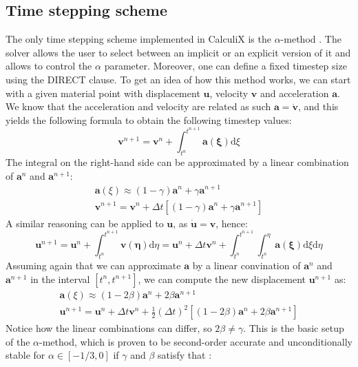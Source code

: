 \documentclass[
  english,        %
  font=times,     %
  onecolumn,      %
]{tumarticle}
\begin{document}
\subsection{Time stepping scheme}\label{sec:alpha}
The only time stepping scheme implemented in CalculiX is the $\alpha$-method \cite{dhondt2017calculix}. The solver allows the user to select between an implicit or an explicit version of it and allows to control the $\alpha$ parameter. Moreover, one can define a fixed timestep size using the DIRECT clause. To get an idea of how this method works, we can start with a given material point with displacement $\boldsymbol{u}$, velocity $\boldsymbol{v}$ and acceleration $\boldsymbol{a}$. We know that the acceleration and velocity are related as such $\boldsymbol{a} = \dot{\boldsymbol{v}}$, and this yields the following formula to obtain the following timestep values:
\begin{equation}
    \boldsymbol{v}^{n+1} = \boldsymbol{v}^n + \int_{t^n}^{t^{n+1}} \boldsymbol{a(\xi)} \text{d}\xi
\end{equation}
The integral on the right-hand side can be approximated by a linear combination of $ \boldsymbol{a}^n$ and $\boldsymbol{a}^{n+1}$:
\begin{gather}
    \boldsymbol{a}(\xi) \approx  (1 - \gamma) \boldsymbol{a}^n + \gamma \boldsymbol{a}^{n+1}\\
    \boldsymbol{v}^{n+1} = \boldsymbol{v}^n + \Delta t \left[ (1 - \gamma) \boldsymbol{a}^n + \gamma \boldsymbol{a}^{n+1} \right]
\end{gather} 
A similar reasoning can be applied to $\boldsymbol{u}$, as $\boldsymbol{\dot{u}} = \boldsymbol{v}$, hence:
\begin{equation}
    \boldsymbol{u}^{n+1} 
    = \boldsymbol{u}^n + \int_{t^n}^{t^{n+1}} \boldsymbol{v(\eta)}  \text{d}\eta 
    = \boldsymbol{u}^n + \Delta t \boldsymbol{v}^n + \int_{t^n}^{t^{n+1}} \int_{t^n}^{\eta} \boldsymbol{a(\xi)} \text{d}\xi \text{d}\eta 
\end{equation}
Assuming again that we can approximate $\boldsymbol{a}$ by a linear convination of $ \boldsymbol{a}^n$ and $\boldsymbol{a}^{n+1}$ in the interval $\left[ t^n, t^{n+1} \right]$, we can compute the new displacement $\boldsymbol{u}^{n+1}$ as:
\begin{gather}
    \boldsymbol{a}(\xi) \approx  (1 - 2\beta) \boldsymbol{a}^n + 2\beta \boldsymbol{a}^{n+1}\\
    \boldsymbol{u}^{n+1} = \boldsymbol{u}^n + \Delta t \boldsymbol{v}^n
    + \frac{1}{2} (\Delta t)^2 \left[ (1 - 2\beta) \boldsymbol{a}^n + 2\beta \boldsymbol{a}^{n+1} \right]
\end{gather} 
Notice how the linear combinations can differ, so $2\beta \neq \gamma$. This is the basic setup of the $\alpha$-method, which is proven to be second-order accurate and unconditionally stable for $\alpha \in [-1/3, 0]$ if $\gamma$ and $\beta$ satisfy that \cite{dhondt2004finite}:
\end{document}
